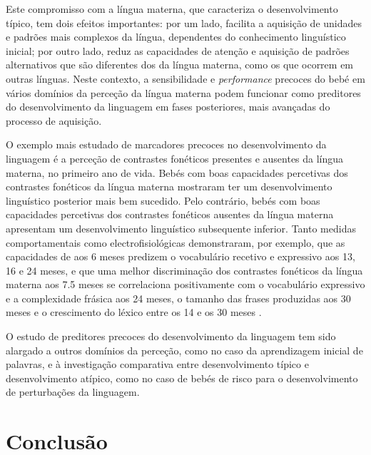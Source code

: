 \documentclass[output=paper]{LSP/langsci}
\begin{document}
Este compromisso com a língua materna, que caracteriza o desenvolvimento típico, tem dois efeitos importantes: por um lado, facilita a aquisição de unidades e padrões mais complexos da língua, dependentes do conhecimento linguístico inicial; por outro lado, reduz as capacidades de atenção e aquisição de padrões alternativos que são diferentes dos da língua materna, como os que ocorrem em outras línguas. Neste contexto, a sensibilidade e \textit{performance} precoces do bebé em vários domínios da perceção da língua materna podem funcionar como preditores do desenvolvimento da linguagem em fases posteriores, mais avançadas do processo de aquisição.

O exemplo mais estudado de marcadores precoces no desenvolvimento da linguagem é a perceção de contrastes fonéticos presentes e ausentes da língua materna, no primeiro ano de vida. Bebés com boas capacidades percetivas dos contrastes fonéticos da língua materna mostraram ter um desenvolvimento linguístico posterior mais bem sucedido. Pelo contrário, bebés com boas capacidades percetivas dos contrastes fonéticos ausentes da língua materna apresentam um desenvolvimento linguístico subsequente inferior. Tanto medidas comportamentais como electrofisiológicas demonstraram, por exemplo, que as capacidades de  aos 6 meses predizem o vocabulário recetivo e expressivo aos 13, 16 e 24 meses, e que uma melhor discriminação dos contrastes fonéticos da língua materna aos 7.5 meses se correlaciona positivamente com o vocabulário expressivo e a complexidade frásica aos 24 meses, o tamanho das frases produzidas aos 30 meses e o crescimento do léxico entre os 14 e os 30 meses \citep{kuhlrivera2008}.

O estudo de preditores precoces do desenvolvimento da linguagem tem sido alargado a outros domínios da perceção, como no caso da aprendizagem inicial de palavras, e à investigação comparativa entre desenvolvimento típico e desenvolvimento atípico, como no caso de bebés de risco para o desenvolvimento de perturbações da linguagem.

\section{Conclusão}
\label{sec:frota_conclusao}
\end{document}
